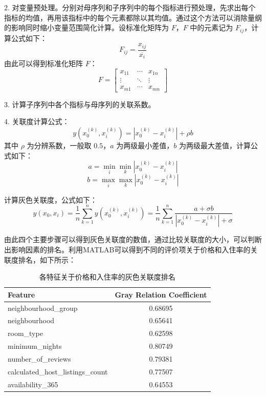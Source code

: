 \documentclass[12pt]{article}
\begin{document}
\begin{CJK}{UTF8}{gbsn}
	2. 对变量预处理。分别对母序列和子序列中的每个指标进行预处理，先求出每个指标的均值，再用该指标中的每个元素都除以其均值。通过这个方法可以消除量纲的影响同时缩小变量范围简化计算。设标准化矩阵为 $F$，$F$ 中的元素记为 $F_{ij}$，计算公式如下：
	\begin{equation}
		F_{ij} = \frac{x_{ij}}{\overline{x_i}} 
	\end{equation}
	由此可以得到标准化矩阵 $F$：
	\begin{equation}
		F = \begin{bmatrix}
			x_{11} & \cdots & x_{1n} \\
			\vdots & \ddots & \vdots \\
			x_{m1} & \cdots & x_{mn}
		\end{bmatrix}
	\end{equation}
	
	3. 计算子序列中各个指标与母序列的关联系数。
	
	4. 关联度计算公式：
	\begin{equation}
		y(x_0^{(k)}, x_i^{(k)}) = \left| x_0^{(k)} - x_i^{(k)} \right| + \rho b
	\end{equation}
	其中 $\rho$ 为分辨系数，一般取 $0.5$，$a$ 为两级最小差值，$b$ 为两级最大差值，计算公式如下：
	\begin{equation}
		a = \min_i \min_k \left| x_0^{(k)} - x_i^{(k)} \right|
	\end{equation}
	\begin{equation}
		b = \max_i \max_k \left| x_0^{(k)} - x_i^{(k)} \right|
	\end{equation}
	
	计算灰色关联度，公式如下：
	\begin{equation}
		y(x_0, x_i) = \frac{1}{n} \sum_{k=1}^{n} y(x_0^{(k)}, x_i^{(k)}) = \frac{1}{n} \sum_{k=1}^{n} \frac{a + \sigma b}{|x_0^{(k)} - x_i^{(k)}| + \sigma}
	\end{equation}
	
	由此四个主要步骤可以得到灰色关联度的数值，通过比较关联度的大小，可以判断出影响因素的排名。利用MATLAB可以得到不同的评价项关于价格和入住率的关联度排名，如下所示：
	
	\begin{table}[h!]
	\centering
	\begin{tabular}{l c}
		\toprule
		\textbf{Feature} & \textbf{Gray Relation Coefficient} \\
		\midrule
		neighbourhood\_group & 0.68695 \\
		neighbourhood & 0.65641 \\
		room\_type & 0.62598 \\
		minimum\_nights & 0.80749 \\
		number\_of\_reviews & 0.79381 \\
		calculated\_host\_listings\_count & 0.77507 \\
		availability\_365 & 0.64553 \\
		\bottomrule
	\end{tabular}
	\caption{各特征关于价格和入住率的灰色关联度排名}
	\end{table}
	

\end{CJK}
\end{document}
